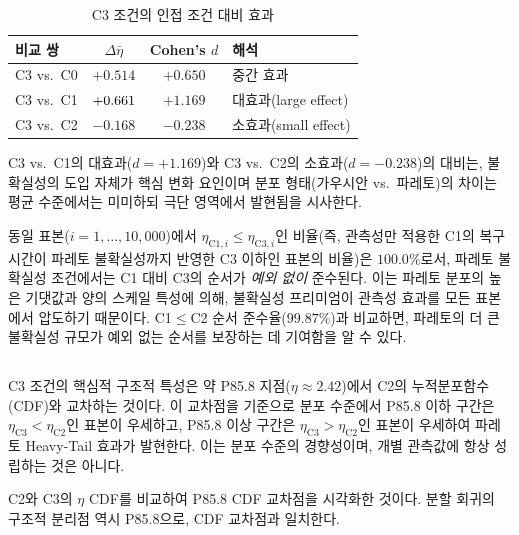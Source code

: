 \begin{table}[htbp]
  \centering
  \caption{C3 조건의 인접 조건 대비 효과 }
  \label{tab:c3_effect_size}
  \begin{tabular}{lccl}
    \toprule
    비교 쌍 & $\Delta\bar{\eta}$ & Cohen's $d$ & 해석 \\
    \midrule
    C3 vs.\ C0 & $+0.514$ & $+0.650$ & 중간 효과 \\
    C3 vs.\ C1 & $\erf{+0.661}{+0.662}$ & $+1.169$ & 대효과(large effect) \\
    C3 vs.\ C2 & $-0.168$ & $-0.238$ & 소효과(small effect) \\
    \bottomrule
  \end{tabular}
\end{table}

C3 vs.\ C1의 대효과($d = +1.169$)와 C3 vs.\ C2의 소효과($d = -0.238$)의
대비는, 불확실성의 도입 자체가 핵심 변화 요인이며 분포 형태(가우시안 vs.\ 파레토)의
차이는 평균 수준에서는 미미하되 극단 영역에서 발현됨을 시사한다.

 동일 표본($i = 1, \ldots, 10{,}000$)에서 $\eta_{\text{C1},i} \leq \eta_{\text{C3},i}$인
비율(즉, 관측성만 적용한 C1의 복구 시간이 파레토 불확실성까지 반영한 C3 이하인 표본의 비율)은 $100.0\%$로서,
파레토 불확실성 조건에서는 C1 대비 C3의 순서가 \textit{예외 없이} 준수된다.
이는 파레토 분포의 높은 기댓값과 양의 스케일 특성에 의해,
불확실성 프리미엄이 관측성 효과를 모든 표본에서 압도하기 때문이다.
C1$\leq$C2 순서 준수율($99.87\%$)과 비교하면, 파레토의 더 큰 불확실성 규모가
예외 없는 순서를 보장하는 데 기여함을 알 수 있다.


\subsection{}
\label{subsec:crossover}

C3 조건의 핵심적 구조적 특성은 약 P85.8 지점($\eta \approx 2.42$)에서
C2의 누적분포함수(CDF)와 교차하는 것이다.
이 교차점을 기준으로 분포 수준에서
P85.8 이하 구간은 $\eta_{\text{C3}} < \eta_{\text{C2}}$인 표본이 우세하고,
P85.8 이상 구간은 $\eta_{\text{C3}} > \eta_{\text{C2}}$인 표본이 우세하여
파레토 Heavy-Tail 효과가 발현한다.
이는 분포 수준의 경향성이며, 개별 관측값에 항상 성립하는 것은 아니다.

 C2와 C3의 $\eta$ CDF를 비교하여
P85.8 CDF 교차점을 시각화한 것이다.
분할 회귀의 구조적 분리점 역시 P85.8으로, CDF 교차점과 일치한다.

